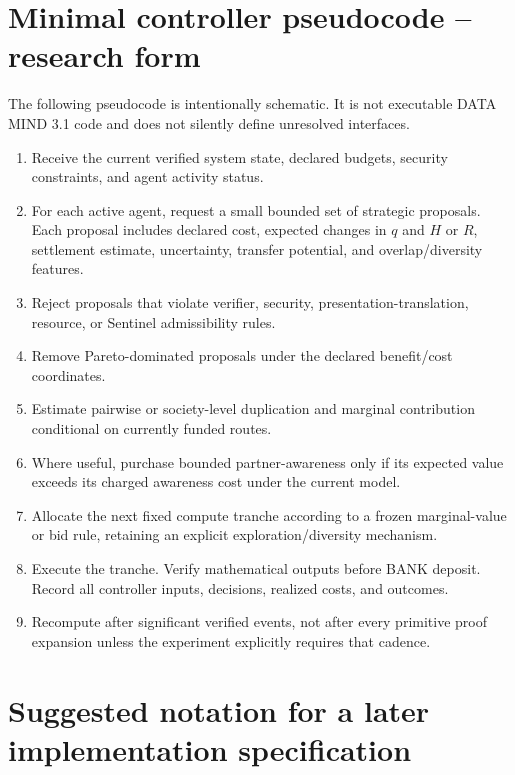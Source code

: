 \documentclass[11pt]{article}
\theoremstyle{definition}
\theoremstyle{remark}
\begin{document}
\section{Minimal controller pseudocode -- research form}

The following pseudocode is intentionally schematic. It is not executable DATA MIND 3.1 code and does not silently define unresolved interfaces.

\begin{enumerate}
\item Receive the current verified system state, declared budgets, security constraints, and agent activity status.
\item For each active agent, request a small bounded set of strategic proposals. Each proposal includes declared cost, expected changes in $q$ and $H$ or $R$, settlement estimate, uncertainty, transfer potential, and overlap/diversity features.
\item Reject proposals that violate verifier, security, presentation-translation, resource, or Sentinel admissibility rules.
\item Remove Pareto-dominated proposals under the declared benefit/cost coordinates.
\item Estimate pairwise or society-level duplication and marginal contribution conditional on currently funded routes.
\item Where useful, purchase bounded partner-awareness only if its expected value exceeds its charged awareness cost under the current model.
\item Allocate the next fixed compute tranche according to a frozen marginal-value or bid rule, retaining an explicit exploration/diversity mechanism.
\item Execute the tranche. Verify mathematical outputs before BANK deposit. Record all controller inputs, decisions, realized costs, and outcomes.
\item Recompute after significant verified events, not after every primitive proof expansion unless the experiment explicitly requires that cadence.
\end{enumerate}

\section{Suggested notation for a later implementation specification}
\end{document}
